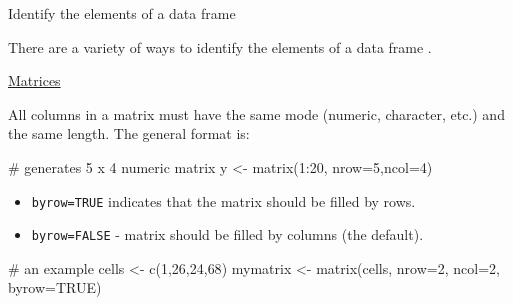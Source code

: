 \documentclass[
  10pt,
  ignorenonframetext,
]{beamer}
\newenvironment{Shaded}{\begin{snugshade}}{\end{snugshade}}
\newcommand{\CommentTok}[1]{\textcolor[rgb]{0.50,0.62,0.50}{#1}}
\newcommand{\DataTypeTok}[1]{\textcolor[rgb]{0.87,0.87,0.75}{#1}}
\newcommand{\DecValTok}[1]{\textcolor[rgb]{0.86,0.86,0.80}{#1}}
\newcommand{\KeywordTok}[1]{\textcolor[rgb]{0.94,0.87,0.69}{#1}}
\newcommand{\NormalTok}[1]{\textcolor[rgb]{0.80,0.80,0.80}{#1}}
\newcommand{\OperatorTok}[1]{\textcolor[rgb]{0.94,0.94,0.82}{#1}}
\newcommand{\OtherTok}[1]{\textcolor[rgb]{0.94,0.94,0.56}{#1}}
\newcommand{\StringTok}[1]{\textcolor[rgb]{0.80,0.58,0.58}{#1}}
\providecommand{\tightlist}{%
  \setlength{\itemsep}{0pt}\setlength{\parskip}{0pt}}
\begin{document}
\begin{frame}[fragile]{Identify the elements of a data frame}
\protect\hypertarget{identify-the-elements-of-a-data-frame}{}

There are a variety of ways to identify the elements of a data frame .

\begin{Shaded}
\end{Shaded}

\end{frame}

\begin{frame}[fragile]{\href{https://www.statmethods.net/input/datatypes.html}{Matrices}}
\protect\hypertarget{matrices}{}

All columns in a matrix must have the same mode (numeric, character,
etc.) and the same length. The general format is:

\begin{Shaded}
\begin{Highlighting}[]
\CommentTok{# generates 5 x 4 numeric matrix}
\NormalTok{y <-}\StringTok{ }\KeywordTok{matrix}\NormalTok{(}\DecValTok{1}\OperatorTok{:}\DecValTok{20}\NormalTok{, }\DataTypeTok{nrow=}\DecValTok{5}\NormalTok{,}\DataTypeTok{ncol=}\DecValTok{4}\NormalTok{)}
\end{Highlighting}
\end{Shaded}

\begin{itemize}
\tightlist
\item
  \texttt{byrow=TRUE} indicates that the matrix should be filled by
  rows.
\item
  \texttt{byrow=FALSE} - matrix should be filled by columns (the
  default).
\end{itemize}

\begin{Shaded}
\begin{Highlighting}[]
\CommentTok{# an example}
\NormalTok{cells <-}\StringTok{ }\KeywordTok{c}\NormalTok{(}\DecValTok{1}\NormalTok{,}\DecValTok{26}\NormalTok{,}\DecValTok{24}\NormalTok{,}\DecValTok{68}\NormalTok{)}
\NormalTok{mymatrix <-}\StringTok{ }\KeywordTok{matrix}\NormalTok{(cells, }\DataTypeTok{nrow=}\DecValTok{2}\NormalTok{, }\DataTypeTok{ncol=}\DecValTok{2}\NormalTok{, }\DataTypeTok{byrow=}\OtherTok{TRUE}\NormalTok{) }
\end{Highlighting}
\end{Shaded}

\end{frame}
\end{document}
